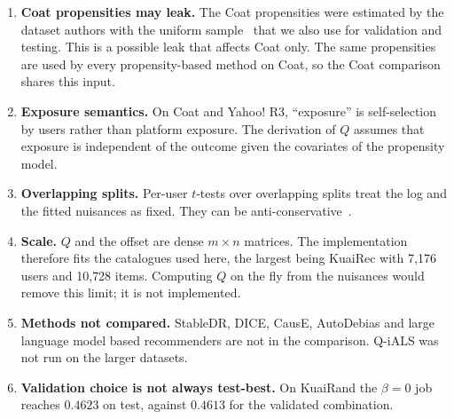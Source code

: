 \begin{enumerate}
decomposition test reported in Section~\ref{sec:ablations}.
\item \textbf{Coat propensities may leak.} The Coat propensities were estimated by the dataset authors with the uniform
sample~\citep{schnabel2016} that we also use for validation and testing. This is a possible leak that affects Coat only.
The same propensities are used by every propensity-based method on Coat, so the Coat comparison shares this input.
\item \textbf{Exposure semantics.} On Coat and Yahoo! R3, ``exposure'' is self-selection by users rather than platform
exposure. The derivation of $Q$ assumes that exposure is independent of the outcome given the covariates of the
propensity model.
\item \textbf{Overlapping splits.} Per-user $t$-tests over overlapping splits treat the log and the fitted nuisances as
fixed. They can be anti-conservative~\citep{nadeau2003}.
\item \textbf{Scale.} $Q$ and the offset are dense $m\times n$ matrices. The implementation therefore fits the catalogues
used here, the largest being KuaiRec with 7{,}176 users and 10{,}728 items. Computing $Q$ on the fly from the nuisances
would remove this limit; it is not implemented.
\item \textbf{Methods not compared.} StableDR, DICE, CausE, AutoDebias and large language model based recommenders
are not in the comparison. Q-iALS was not run on the larger datasets.
\item \textbf{Validation choice is not always test-best.} On KuaiRand the $\beta=0$ job reaches $0.4623$ on test, against
$0.4613$ for the validated combination.
\end{enumerate}
